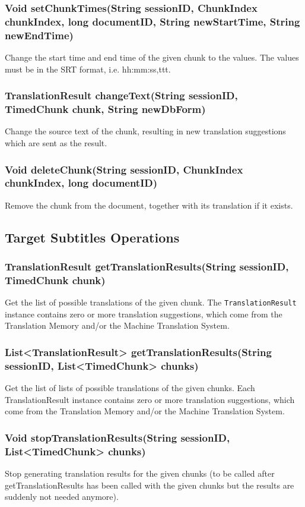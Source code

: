 {\subsubsection{Void setChunkTimes(String sessionID, ChunkIndex chunkIndex, long documentID, String newStartTime, String newEndTime)}
Change the start time and end time of the given chunk to the values. The values must be in the SRT format, i.e. hh:mm:ss,ttt.

\subsubsection{TranslationResult changeText(String sessionID, TimedChunk chunk, String newDbForm)}
Change the source text of the chunk,
resulting in new translation suggestions
which are sent as the result.

\subsubsection{Void deleteChunk(String sessionID, ChunkIndex chunkIndex, long documentID)}
Remove the chunk from the document, together with its translation if it exists.

\subsection{Target Subtitles Operations}

\subsubsection{TranslationResult getTranslationResults(String sessionID, TimedChunk chunk)}
Get the list of possible translations of the given chunk.
The {\tt TranslationResult} instance contains zero or more translation suggestions, which come from the Translation Memory and/or the Machine Translation System.

\subsubsection{List<TranslationResult> getTranslationResults(String sessionID, List<TimedChunk> chunks)}
Get the list of lists of possible translations of the given chunks.
Each TranslationResult instance contains zero or more translation suggestions, which come from the Translation Memory and/or the Machine Translation System.

\subsubsection{Void stopTranslationResults(String sessionID, List<TimedChunk> chunks)}
Stop generating translation results for the given chunks
(to be called after getTranslationResults has been called
with the given chunks but the results are suddenly not needed anymore).

}
